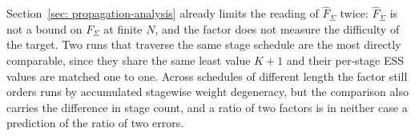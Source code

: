 \documentclass{article}
\begin{document}
Section~\ref{sec: propagation-analysis} already limits the reading of $\hat F_\Sigma$ twice: $\hat F_\Sigma$ is not a bound on $F_\Sigma$ at finite $N$, and the factor does not measure the difficulty of the target. Two runs that traverse the same stage schedule are the most directly comparable, since they share the same least value $K+1$ and their per-stage ESS values are matched one to one. Across schedules of different length the factor still orders runs by accumulated stagewise weight degeneracy, but the comparison also carries the difference in stage count, and a ratio of two factors is in neither case a prediction of the ratio of two errors.
\end{document}
